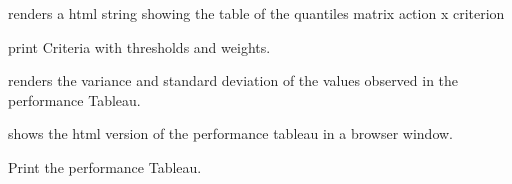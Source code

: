 \documentclass[letterpaper,10pt,english]{sphinxmanual}
\begin{document}
\begin{fulllineitems}
\begin{fulllineitems}
\end{fulllineitems}


\begin{fulllineitems}
\label{techDoc:perfTabs.PerformanceTableau.showAllQuantiles}
renders a html string showing the table of
the quantiles matrix action x criterion

\end{fulllineitems}


\begin{fulllineitems}
\label{techDoc:perfTabs.PerformanceTableau.showCriteria}
print Criteria with thresholds and weights.

\end{fulllineitems}


\begin{fulllineitems}
\label{techDoc:perfTabs.PerformanceTableau.showEvaluationStatistics}
renders the variance and standard deviation of
the values observed in the performance Tableau.

\end{fulllineitems}


\begin{fulllineitems}
\label{techDoc:perfTabs.PerformanceTableau.showHTMLPerformanceTableau}
shows the html version of the performance tableau in a browser window.

\end{fulllineitems}


\begin{fulllineitems}
\label{techDoc:perfTabs.PerformanceTableau.showPerformanceTableau}
Print the performance Tableau.


\end{fulllineitems}
\end{fulllineitems}
\end{document}
